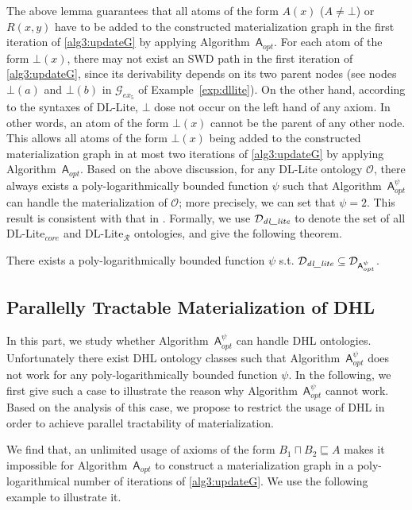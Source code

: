 \documentclass[final,1p,times]{elsarticle}
\begin{document}
The above lemma guarantees that all atoms of the form $A(x)$ ($A\neq\bot$) or $R(x,y)$
have to be added to the constructed materialization graph in the first iteration of
\ref{alg3:updateG} by applying Algorithm~$\mathsf{A}_{opt}$.
For each atom of the form $\bot(x)$, there may not exist an SWD path in the first iteration
of \ref{alg3:updateG}, since its derivability depends on its two parent nodes
(see nodes $\bot(a)$ and $\bot(b)$ in $\mathcal{G}_{ex_5}$ of
Example~\ref{exp:dllite}). On the other hand, according to the syntaxes of DL-Lite,
$\bot$ dose not occur on the left hand of any axiom. In other words,
an atom of the form $\bot(x)$ cannot be the parent of any other node.
This allows all atoms of the form $\bot(x)$ being added
to the constructed materialization graph in at most two iterations of
\ref{alg3:updateG} by applying Algorithm~$\mathsf{A}_{opt}$.
Based on the above discussion, for any DL-Lite ontology $\mathcal{O}$,
there always exists a poly-logarithmically bounded function $\psi$ such that
Algorithm~$\mathsf{A}_{opt}^{\psi}$ can handle the materialization of $\mathcal{O}$;
more precisely, we can set that $\psi=2$. This result is consistent with
that in \cite{CalvaneseGLLR07}.
Formally, we use $\mathcal{D}_{\textit{\text{dl\_lite}}}$
to denote the set of all DL-Lite$_{core}$ and DL-Lite$_\mathcal{R}$ ontologies, and give the following theorem.

\begin{theorem}\label{theorem:dl-lite}
There exists a poly-logarithmically bounded function $\psi$ s.t.
$\mathcal{D}_{\textit{\text{dl\_lite}}}\subseteq\mathcal{D}_{\mathsf{A}_{opt}^{\psi}}$.
\end{theorem}


\subsection{Parallelly Tractable Materialization of DHL}

In this part, we study whether Algorithm~$\mathsf{A}_{opt}^\psi$ can handle DHL ontologies.
Unfortunately there exist DHL ontology classes such that Algorithm~$\mathsf{A}_{opt}^\psi$
does not work for any poly-logarithmically bounded function $\psi$.
In the following, we first give such a case
to illustrate the reason why Algorithm~$\mathsf{A}_{opt}^\psi$ cannot work.
Based on the analysis of this case, we propose to restrict
the usage of DHL in order to achieve parallel tractability
of materialization.

We find that, an unlimited usage of axioms of the
form $B_1\sqcap B_2\sqsubseteq A$
makes it impossible for Algorithm~$\mathsf{A}_{opt}$ to construct a materialization graph
in a poly-logarithmical number of iterations of \ref{alg3:updateG}.
We use the following example to illustrate it.
\end{document}
